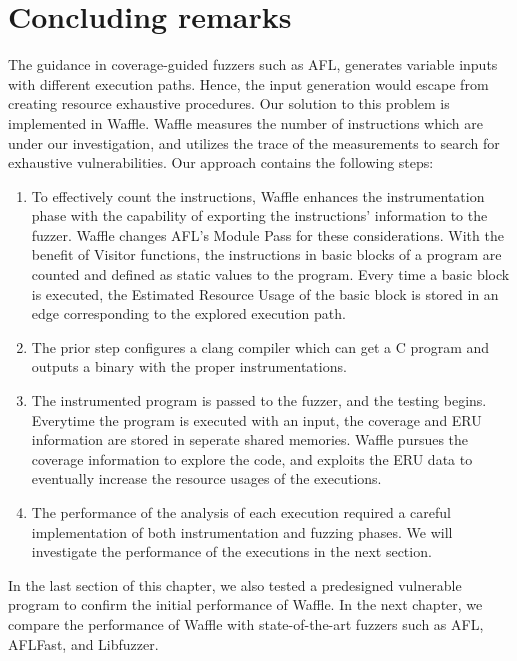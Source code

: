 \section{Concluding remarks}

The guidance in coverage-guided fuzzers such as AFL, generates variable inputs with different execution paths. Hence, the input generation would escape from creating resource exhaustive procedures. Our solution to this problem is implemented in Waffle. Waffle measures the number of instructions which are under our investigation, and utilizes the trace of the measurements to search for exhaustive vulnerabilities. Our approach contains the following steps: 

\begin{enumerate}
    \item To effectively count the instructions, Waffle enhances the instrumentation phase with the capability of exporting the instructions' information to the fuzzer. Waffle changes AFL's Module Pass for these considerations. With the benefit of Visitor functions, the instructions in basic blocks of a program are counted and defined as static values to the program. Every time a basic block is executed, the Estimated Resource Usage of the basic block is stored in an edge corresponding to the explored execution path.
    \item The prior step configures a clang compiler which can get a C program and outputs a binary with the proper instrumentations.
    \item The instrumented program is passed to the fuzzer, and the testing begins. Everytime the program is executed with an input, the coverage and ERU information are stored in seperate shared memories. Waffle pursues the coverage information to explore the code, and exploits the ERU data to eventually increase the resource usages of the executions.
    \item The performance of the analysis of each execution required a careful implementation of both instrumentation and fuzzing phases. We will investigate the performance of the executions in the next section.
\end{enumerate}

In the last section of this chapter, we also tested a predesigned vulnerable program to confirm the initial performance of Waffle. In the next chapter, we compare the performance of Waffle with state-of-the-art fuzzers such as AFL, AFLFast, and Libfuzzer.